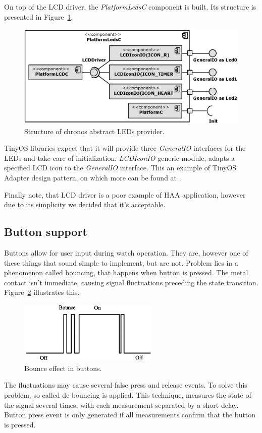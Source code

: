 On top of the LCD driver, the \emph{PlatformLedsC} component is built. Its structure is presented in Figure~\ref{fig:platform_leds_c}.
\begin{figure}[h]
  \centering
  \includegraphics{diagrams/platform_leds_c.eps}
  \caption{Structure of chronos abstract LEDs provider.}
  \label{fig:platform_leds_c}
\end{figure}
TinyOS libraries expect that it will provide three \emph{GeneralIO} interfaces for the LEDs and take care of initialization. \emph{LCDIconIO} generic module, adapts a specified LCD icon to the \emph{GeneralIO} interface. This an example of TinyOS Adapter design pattern, on which more can be found at \cite[ch. 8]{TOSProg}.

Finally note, that LCD driver is a poor example of HAA application, however due to its simplicity we decided that it's acceptable.

\subsection{Button support}

Buttons allow for user input during watch operation. They are, however one of these things that sound simple to implement, but are not. Problem lies in a phenomenon called bouncing, that happens when button is pressed. The metal contact isn't immediate, causing signal fluctuations preceding the state transition. Figure~\ref{fig:bouncing} illustrates this.
\begin{figure}[h]
  \centering
  \includegraphics[width=0.6\textwidth]{img/Bounce.eps}
  \caption{Bounce effect in buttons.}
  \label{fig:bouncing}
\end{figure}
The fluctuations may cause several false press and release events. To solve this problem, so called de-bouncing is applied. This technique, measures the state of the signal several times, with each measurement separated by a short delay. Button press event is only generated if all measurements confirm that the button is pressed.

